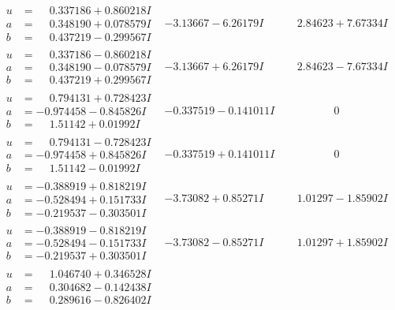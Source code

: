 \documentclass[1p]{elsarticle_modified}
\theoremstyle{definition}
\begin{document}
$$\begin{array}{c|c|c}
\begin{aligned}
u &= \phantom{-}0.337186 + 0.860218 I \\
a &= \phantom{-}0.348190 + 0.078579 I \\
b &= \phantom{-}0.437219 - 0.299567 I\end{aligned}
 & -3.13667 - 6.26179 I & \phantom{-}2.84623 + 7.67334 I \\ \hline\begin{aligned}
u &= \phantom{-}0.337186 - 0.860218 I \\
a &= \phantom{-}0.348190 - 0.078579 I \\
b &= \phantom{-}0.437219 + 0.299567 I\end{aligned}
 & -3.13667 + 6.26179 I & \phantom{-}2.84623 - 7.67334 I \\ \hline\begin{aligned}
u &= \phantom{-}0.794131 + 0.728423 I \\
a &= -0.974458 - 0.845826 I \\
b &= \phantom{-}1.51142 + 0.01992 I\end{aligned}
 & -0.337519 - 0.141011 I & \phantom{-0.000000 } 0 \\ \hline\begin{aligned}
u &= \phantom{-}0.794131 - 0.728423 I \\
a &= -0.974458 + 0.845826 I \\
b &= \phantom{-}1.51142 - 0.01992 I\end{aligned}
 & -0.337519 + 0.141011 I & \phantom{-0.000000 } 0 \\ \hline\begin{aligned}
u &= -0.388919 + 0.818219 I \\
a &= -0.528494 + 0.151733 I \\
b &= -0.219537 - 0.303501 I\end{aligned}
 & -3.73082 + 0.85271 I & \phantom{-}1.01297 - 1.85902 I \\ \hline\begin{aligned}
u &= -0.388919 - 0.818219 I \\
a &= -0.528494 - 0.151733 I \\
b &= -0.219537 + 0.303501 I\end{aligned}
 & -3.73082 - 0.85271 I & \phantom{-}1.01297 + 1.85902 I \\ \hline\begin{aligned}
u &= \phantom{-}1.046740 + 0.346528 I \\
a &= \phantom{-}0.304682 - 0.142438 I \\
b &= \phantom{-}0.289616 - 0.826402 I\end{aligned}

\end{array}$$
\end{document}
